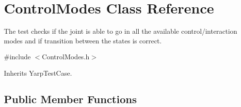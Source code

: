 \section{Control\-Modes Class Reference}
\label{classControlModes}


The test checks if the joint is able to go in all the available control/interaction modes and if transition between the states is correct.  




{\ttfamily \#include $<$Control\-Modes.\-h$>$}



Inherits Yarp\-Test\-Case.

\subsection*{Public Member Functions}
